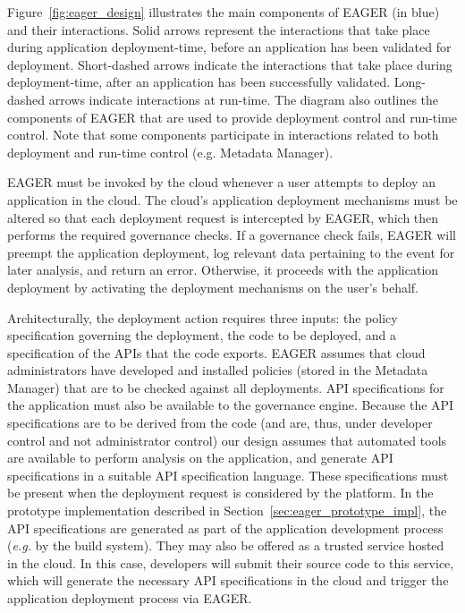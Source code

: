 Figure~\ref{fig:eager_design} illustrates the main components of EAGER (in
blue) and their interactions. Solid arrows represent the interactions that take place
during application deployment-time, before an application has been validated
for deployment. Short-dashed arrows indicate the interactions that take place
during deployment-time, after an application has been successfully validated.
Long-dashed arrows indicate interactions at run-time. The diagram also outlines the
components of EAGER that are used to provide deployment  control and run-time control.
Note that some components participate in interactions related to both deployment and
run-time control (e.g. Metadata Manager).

EAGER must be invoked by the cloud whenever a user
attempts to deploy an application in the cloud.
The cloud's application deployment mechanisms must be altered so that
each deployment request is
intercepted by EAGER, which then performs the required governance checks.
If a governance check fails, EAGER will preempt the application deployment,
log relevant data pertaining to the event for later analysis,  and
return an error. Otherwise, it proceeds with the application deployment by
activating the deployment mechanisms on the user's 
behalf. 

Architecturally, the deployment action requires three inputs: the policy
specification governing the deployment, the code to be deployed, and a
specification of the APIs that the code exports.
EAGER assumes that cloud administrators have developed and installed policies
(stored in the Metadata Manager)
that are to be checked against all deployments.  API specifications for the
application must also be available to the governance engine.  Because the API
specifications are to be derived from the code (and are, thus, under developer
control and not administrator control) our design assumes that automated
tools are available
to perform analysis on the application, and
generate API specifications in a suitable API specification language. These
specifications must be present
when the deployment request is considered by the platform.  In the prototype
implementation described in Section~\ref{sec:eager_prototype_impl}, the API specifications are
generated as part of the application development process ({\em e.g.} by the
build system).  They may also
be offered as a trusted service hosted in the cloud. 
In this case, developers will submit their source code
to this service, which will generate the necessary API specifications in the cloud and trigger
the application deployment process via EAGER.


